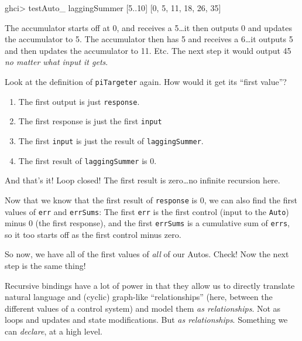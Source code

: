 \documentclass[]{article}
\newenvironment{Shaded}{}{}
\newcommand{\DecValTok}[1]{\textcolor[rgb]{0.25,0.63,0.44}{{#1}}}
\newcommand{\FunctionTok}[1]{\textcolor[rgb]{0.02,0.16,0.49}{{#1}}}
\newcommand{\NormalTok}[1]{{#1}}
\begin{document}
\begin{Shaded}
\begin{Highlighting}[]
\NormalTok{ghci}\FunctionTok{>} \NormalTok{testAuto_ laggingSummer [}\DecValTok{5}\FunctionTok{..}\DecValTok{10}\NormalTok{]}
\NormalTok{[}\DecValTok{0}\NormalTok{, }\DecValTok{5}\NormalTok{, }\DecValTok{11}\NormalTok{, }\DecValTok{18}\NormalTok{, }\DecValTok{26}\NormalTok{, }\DecValTok{35}\NormalTok{]}
\end{Highlighting}
\end{Shaded}

The accumulator starts off at 0, and receives a 5\ldots{}it then outputs
0 and updates the accumulator to 5. The accumulator then has 5 and
receives a 6\ldots{}it outputs 5 and then updates the accumulator to 11.
Etc. The next step it would output 45 \emph{no matter what input it
gets}.

Look at the definition of \texttt{piTargeter} again. How would it get
its ``first value''?

\begin{enumerate}
\def\labelenumi{\arabic{enumi}.}
\tightlist
\item
  The first output is just \texttt{response}.
\item
  The first response is just the first \texttt{input}
\item
  The first \texttt{input} is just the result of \texttt{laggingSummer}.
\item
  The first result of \texttt{laggingSummer} is 0.
\end{enumerate}

And that's it! Loop closed! The first result is zero\ldots{}no infinite
recursion here.

Now that we know that the first result of \texttt{response} is 0, we can
also find the first values of \texttt{err} and \texttt{errSums}: The
first \texttt{err} is the first control (input to the \texttt{Auto})
minus 0 (the first response), and the first \texttt{errSums} is a
cumulative sum of \texttt{errs}, so it too starts off as the first
control minus zero.

So now, we have all of the first values of \emph{all} of our Autos.
Check! Now the next step is the same thing!

Recursive bindings have a lot of power in that they allow us to directly
translate natural language and (cyclic) graph-like ``relationships''
(here, between the different values of a control system) and model them
\emph{as relationships}. Not as loops and updates and state
modifications. But \emph{as relationships}. Something we can
\emph{declare}, at a high level.
\end{document}
